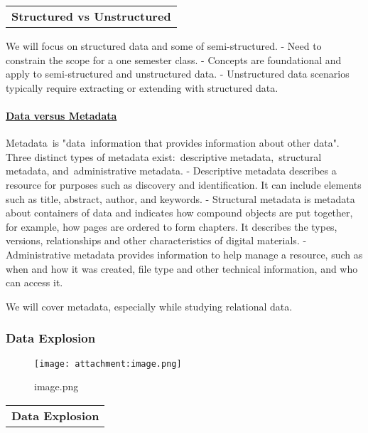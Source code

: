 \documentclass[11pt]{article}
\makeatletter
\def\maxwidth{\ifdim\Gin@nat@width>\linewidth\linewidth
    \else\Gin@nat@width\fi}
\let\Oldincludegraphics\includegraphics
\renewcommand{\includegraphics}[1]{\Oldincludegraphics[width=.8\maxwidth]{#1}}
\makeatother
\begin{document}
\begin{longtable}[]{@{}c@{}}
\toprule
\tabularnewline
\midrule
\endhead
\textbf{Structured vs Unstructured}\tabularnewline
\bottomrule
\end{longtable}

We will focus on structured data and some of semi-structured. - Need to
constrain the scope for a one semester class. - Concepts are
foundational and apply to semi-structured and unstructured data. -
Unstructured data scenarios typically require extracting or extending
with structured data.

\paragraph{\texorpdfstring{\href{https://en.wikipedia.org/wiki/Metadata}{Data
versus Metadata}}{Data versus Metadata}}\label{data-versus-metadata}

Metadata~is "data~information that provides information about other
data". Three distinct types of metadata exist:~descriptive
metadata,~structural metadata, and~administrative metadata. -
Descriptive metadata describes a resource for purposes such as discovery
and identification. It can include elements such as title, abstract,
author, and keywords. - Structural metadata is metadata about containers
of data and indicates how compound objects are put together, for
example, how pages are ordered to form chapters. It describes the types,
versions, relationships and other characteristics of digital materials.
- Administrative metadata provides information to help manage a
resource, such as when and how it was created, file type and other
technical information, and who can access it.

We will cover metadata, especially while studying relational data.

    \subsubsection{Data Explosion}\label{data-explosion}

\begin{figure}
\centering
\texttt{[image: attachment:image.png]}
\caption{image.png}
\end{figure}

\begin{longtable}[]{@{}c@{}}
\toprule
\tabularnewline
\midrule
\endhead
\textbf{Data Explosion}\tabularnewline
\bottomrule
\end{longtable}
\end{document}
